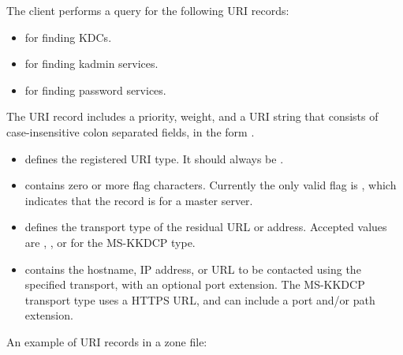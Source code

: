 \documentclass[letterpaper,10pt,english]{sphinxmanual}
\begin{document}
The client performs a query for the following URI records:
\begin{itemize}
\item {} 
 for finding KDCs.

\item {} 
 for finding kadmin services.

\item {} 
 for finding password services.

\end{itemize}

The URI record includes a priority, weight, and a URI string that
consists of case-insensitive colon separated fields, in the form
.
\begin{itemize}
\item {} 
 defines the registered URI type.  It should always be
.

\item {} 
 contains zero or more flag characters.  Currently the only
valid flag is , which indicates that the record is for a master
server.

\item {} 
 defines the transport type of the residual URL or
address.  Accepted values are , , or  for the
MS-KKDCP type.

\item {} 
 contains the hostname, IP address, or URL to be
contacted using the specified transport, with an optional port
extension.  The MS-KKDCP transport type uses a HTTPS URL, and can
include a port and/or path extension.

\end{itemize}

An example of URI records in a zone file:

%
\begin{sphinxVerbatim}[commandchars=\\\{\}]
      
                           
                           
                           
\end{sphinxVerbatim}
\end{document}
